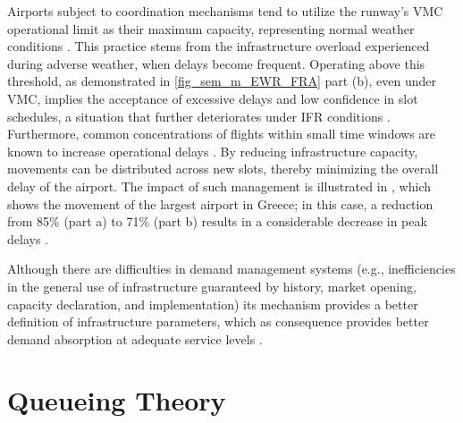 Airports subject to coordination mechanisms tend to utilize the runway's 
\acrfull{VMC} operational limit as their maximum capacity, representing 
normal weather conditions \cite{cavusoglu2021minimum}. 
%
This practice stems from the infrastructure overload experienced during 
adverse weather, when delays become frequent. 
%
Operating above this threshold, as demonstrated in \ref{fig_sem_m_EWR_FRA} 
part (b), even under \acrshort{VMC}, implies the acceptance of excessive 
delays and low confidence in slot schedules, a situation that further 
deteriorates under \acrshort{IFR} conditions \cite{cavusoglu2021minimum}. 
%
Furthermore, common concentrations of flights within small time windows are 
known to increase operational delays \cite{zografos2017increasing}. 
%
By reducing infrastructure capacity, movements can be distributed across 
new slots, thereby minimizing the overall delay of the airport. 
%
The impact of such management is illustrated in , 
which shows the movement of the largest airport in Greece; in this case, a 
reduction from 85\% (part a) to 71\% (part b) results in a considerable 
decrease in peak delays \cite{zografos2017increasing}.



%



Although there are difficulties in demand management systems (e.g.,
inefficiencies in the general use of infrastructure guaranteed by history,
market opening, capacity declaration, and implementation) its mechanism provides
a better definition of infrastructure parameters, which as consequence provides
better demand absorption at adequate service levels \cite{morisset2011capacity}.







\section{Queueing Theory}
\label{sec:Queueing_Theory}





